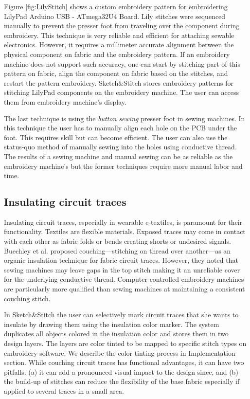 \documentclass[header.tex]{subfiles}
\begin{document}
Figure \ref{fig:LilyStitch} shows a custom embroidery pattern for embroidering LilyPad Arduino USB - ATmega32U4 Board. Lily stitches were sequenced manually to prevent the presser foot from traveling over the component during embroidery. This technique is very reliable and efficient for attaching sewable electronics. However, it requires a millimeter accurate alignment between the physical component on fabric and the embroidery pattern. If an embroidery machine does not support such accuracy, one can start by stitching part of this pattern on fabric, align the component on fabric based on the stitches, and restart the pattern embroidery. Sketch\&Stitch stores embroidery patterns for stitching LilyPad components on the embroidery machine. The user can access them from embroidery machine's display.

The last technique is using the \textit{button sewing} presser foot in sewing machines. In this technique the user has to manually align each hole on the PCB under the foot. This requires skill but can become efficient. The user can also use the status-quo method of manually sewing into the holes using conductive thread. 
The results of a sewing machine and manual sewing can be as reliable as the embroidery machine's but the former techniques require more manual labor and time.


\subsection{Insulating circuit traces}
Insulating circuit traces, especially in wearable e-textiles, is paramount for their functionality. Textiles are flexible materials. Exposed traces may come in contact with each other as fabric folds or bends creating shorts or undesired signals. Buechley et al. \cite{Buechley2009} proposed couching---stitching on thread over another---as an organic insulation technique for fabric circuit traces. However, they noted that sewing machines may leave gaps in the top stitch making it an unreliable cover for the underlying conductive thread. Computer-controlled embroidery machines are particularly more qualified than sewing machines at maintaining a consistent couching stitch. 


In Sketch\&Stitch the user can selectively mark circuit traces that she wants to insulate by drawing them using the insulation color marker. The system duplicates all objects colored in the insulation color and stores them in two design layers. The layers are color tinted to be mapped to specific stitch types on embroidery software. We describe the color tinting process in Implementation section. While couching circuit traces has functional advantages, it can have two pitfalls: (a) it can add a pronounced visual impact to the design since, and (b) the build-up of stitches can reduce the flexibility of the base fabric especially if applied to several traces in a small area.
\end{document}
